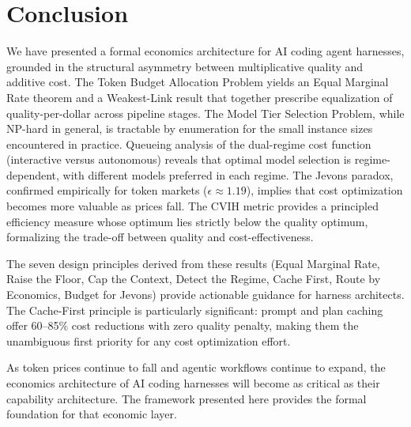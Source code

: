 \documentclass[11pt, a4paper, copyright]{googledeepmind}
\begin{document}
\section{Conclusion}\label{sec:conclusion}

We have presented a formal economics architecture for AI coding agent harnesses, grounded in the structural asymmetry between multiplicative quality and additive cost. The Token Budget Allocation Problem yields an Equal Marginal Rate theorem and a Weakest-Link result that together prescribe equalization of quality-per-dollar across pipeline stages. The Model Tier Selection Problem, while NP-hard in general, is tractable by enumeration for the small instance sizes encountered in practice. Queueing analysis of the dual-regime cost function (interactive versus autonomous) reveals that optimal model selection is regime-dependent, with different models preferred in each regime. The Jevons paradox, confirmed empirically for token markets ($\epsilon \approx 1.19$), implies that cost optimization becomes more valuable as prices fall. The CVIH metric provides a principled efficiency measure whose optimum lies strictly below the quality optimum, formalizing the trade-off between quality and cost-effectiveness.

The seven design principles derived from these results (Equal Marginal Rate, Raise the Floor, Cap the Context, Detect the Regime, Cache First, Route by Economics, Budget for Jevons) provide actionable guidance for harness architects. The Cache-First principle is particularly significant: prompt and plan caching offer 60--85\% cost reductions with zero quality penalty, making them the unambiguous first priority for any cost optimization effort.

As token prices continue to fall and agentic workflows continue to expand, the economics architecture of AI coding harnesses will become as critical as their capability architecture. The framework presented here provides the formal foundation for that economic layer.
\end{document}
